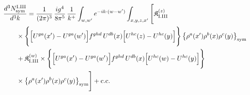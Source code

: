 \begin{align}\label{eq:H-I.III-3}
&\frac{d^{3}N^{\rm I.III}_{{\rm sym}}}{d^{3}k}=\frac{1}{(2\pi)^{3}}\, \frac{ig^{4}}{8\pi^{5}}\, \frac{1}{k^{+}} \int_{w,w'}e^{-ik\cdot(w-w')} \int_{x,y,z,x'}\Bigg[ \mathfrak{K}^{(z)}_{\rm I.III}\notag\\
&\quad\quad \times \Bigg\{\Big[U^{ga}(x')-U^{ga}(w')\Big]f^{ghd}\, U^{db}(x)\Big[U^{hc}(z)-U^{hc}(y)\Big]\Bigg\}\, \big\{\rho^{a}(x')\rho^{b}(x)\rho^{c}(y)\big\}_{\rm sym}\notag\\
&\quad\quad + \mathfrak{K}^{(w)}_{\rm I.III} \times \Bigg\{\Big[U^{ga}(x')-U^{ga}(w')\Big]f^{ghd}\, U^{db}(x)\Big[U^{hc}(w)-U^{hc}(y)\Big]\Bigg\}\notag\\
&\quad\quad \times \big\{\rho^{a}(x')\rho^{b}(x)\rho^{c}(y)\big\}_{\rm sym}\Bigg] +{\rm c.c.}
\end{align}
